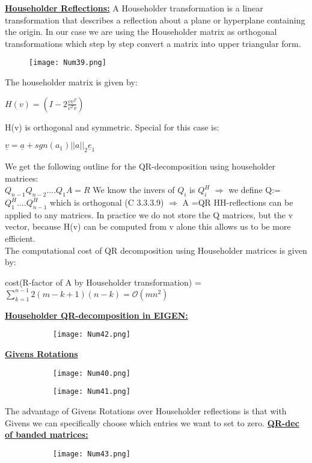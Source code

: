\documentclass[8pt]{extreport}
\begin{document}
\underline{\textbf{Householder Reflections:}} A Householder transformation is a linear transformation that describes a reflection about a plane or hyperplane containing the origin. In our case we are using the Householder matrix as orthogonal transformations which step by step convert a matrix into upper triangular form.
\begin{figure}[H]
\centering
\texttt{[image: Num39.png]}
\end{figure}
The householder matrix is given by:
\begin{center}
$H(v) = (I- 2\frac{vv^T}{v^Tv})$
\end{center}
H(v) is orthogonal and symmetric. Special for this case is:
\begin{center}
$\underline{v} = \underline{a} + sgn(a_1)||a||_2\underline{e}_1$ 
\end{center}
We get the following outline for the QR-decomposition using householder matrices:\\
$Q_{n-1}Q_{n-2}....Q_1A = R$ We know the invers of $Q_i$ is $Q_i^H$ 
$\Rightarrow$ we define Q:=$Q_1^H....Q_{n-1}^H$ which is orthogonal (C 3.3.3.9)
$\Rightarrow$ A =QR
HH-reflections can be applied to any matrices. In practice we do not store the Q matrices, but the v vector, because H(v) can be computed from v alone this allows us to be more efficient.\\
The computational cost of QR decomposition using Householder matrices is given by:
\begin{center}
cost(R-factor of A by Householder transformation) = $\displaystyle\sum_{k=1}^{n-1}2(m-k+1)(n-k) = \mathcal{O}(mn^2)$
\end{center}
\underline{\textbf{Householder QR-decomposition in EIGEN:}}
\begin{figure}[H]
\centering
\begin{subfigure}[b]{0.32\linewidth}
\texttt{[image: Num42.png]}
\end{subfigure}
\end{figure}
\underline{\textbf{Givens Rotations}}
\begin{figure}[H]
\centering
\begin{subfigure}[b]{0.32\linewidth}
\texttt{[image: Num40.png]}
\end{subfigure}
\begin{subfigure}[b]{0.32\linewidth}
\texttt{[image: Num41.png]}
\end{subfigure}
\end{figure}
The advantage of Givens Rotations over Householder reflections is that with Givens we can specifically choose which entries we want to set to zero.
\underline{\textbf{QR-dec of banded matrices:}}
\begin{figure}[H]
\centering
\begin{subfigure}[b]{0.32\linewidth}
\texttt{[image: Num43.png]}
\end{subfigure}
\end{figure}
\end{document}
